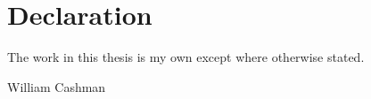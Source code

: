 
\chapter*{Declaration}\label{declaration}
\thispagestyle{empty}
The work in this thesis is my own except where otherwise stated.

\vspace{1in}


\hfill\hfill\hfill
%
William Cashman
%
\hspace*{\fill}
